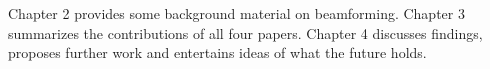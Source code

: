 Chapter 2 provides some background material on beamforming. Chapter 3 summarizes the contributions of all four papers. Chapter 4 discusses findings, proposes further work and entertains ideas of what the future holds.

%
%      
%   
%   
%
%
%   
%
%      
%
%
%    
%   
%   
%   
%   

